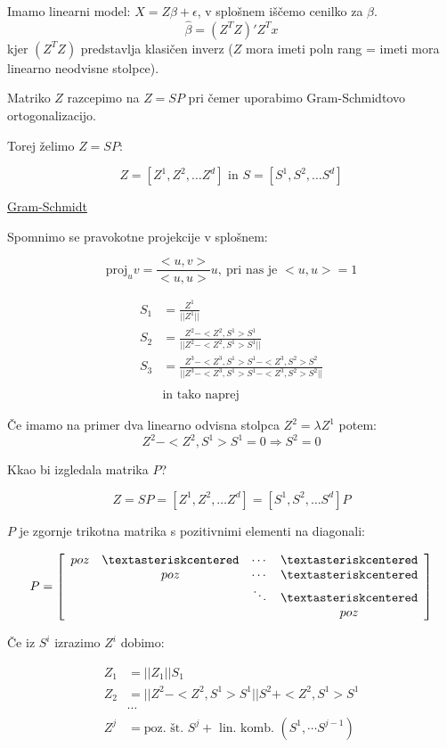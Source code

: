 \documentclass{homework}
\begin{document}
Imamo linearni model: $X = Z \beta + \epsilon$, v splošnem iščemo cenilko za $\beta$.
$$ \hat{\beta} = (Z^TZ)'Z^Tx$$
kjer $(Z^TZ)$ predstavlja klasičen inverz ($Z$ mora imeti poln rang = imeti mora linearno neodvisne stolpce).

Matriko $Z$ razcepimo na $Z = SP$ pri čemer uporabimo Gram-Schmidtovo ortogonalizacijo.

Torej želimo $Z = SP$:

$$Z = [Z^1, Z^2, \dots Z^d] \text{  in  }S = [S^1, S^2, \dots S^d]$$

\underline{Gram-Schmidt}

Spomnimo se pravokotne projekcije v splošnem:

$$ \text{proj}_uv = \frac{<u, v>}{<u,u>}u,\ \text{pri nas je } <u,u> = 1$$


\begin{align*}
S_1 & = \frac{Z^1}{|| Z^1 ||} \\
S_2 & = \frac{Z^2 - <Z^2, S^1>S^1}{|| Z^2 - <Z^2, S^1>S^1 ||} \\
S_3 & = \frac{Z^3 - <Z^3, S^1>S^1 - <Z^3, S^2>S^2}{|| Z^3 - <Z^3, S^1>S^1 - <Z^3, S^2>S^2 ||} \\
& \text{ } \\
& \text{in tako naprej}
\end{align*}

Če imamo na primer dva linearno odvisna stolpca $Z^2 = \lambda Z^1$ potem:
$$Z^2 - <Z^2, S^1>S^1 = 0 \Rightarrow S^2 = 0$$

Kkao bi izgledala matrika $P$?

$$Z = SP = [Z^1, Z^2, \dots Z^d] = [S^1, S^2, \dots S^d] P$$

$P$ je zgornje trikotna matrika s pozitivnimi elementi na diagonali:

\[
  P =
  \left[ {\begin{array}{cccc}
    poz & \textasteriskcentered & \cdots & \textasteriskcentered \\
     & poz & \cdots & \textasteriskcentered \\
     &  & \ddots & \textasteriskcentered \\
     &  &  & poz\\
  \end{array} } \right]
\]

Če iz $S^i$ izrazimo $Z^i$ dobimo:

\begin{align*}
  Z_1 & = ||Z_1|| S_1 \\
  Z_2 & = || Z^2 - <Z^2, S^1>S^1 ||S^2 + <Z^2, S^1>S^1 \\
  & \cdots \\
  Z^j & = \text{poz. št. } S^j + \text{ lin. komb. } (S^1, \cdots S^{j-1})
\end{align*}
\end{document}
